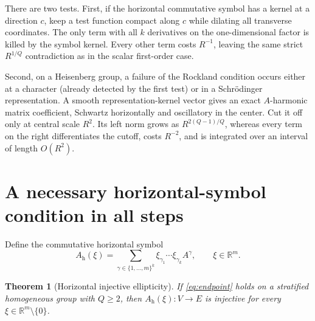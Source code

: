 \documentclass[11pt]{article}
\newtheorem{theorem}{Theorem}
\newcommand{\R}{\mathbb R}
\begin{document}
There are two tests.  First, if the horizontal commutative symbol has a kernel
at a direction $c$, keep a test function compact along $c$ while dilating all
transverse coordinates.  The only term with all $k$ derivatives on the
one-dimensional factor is killed by the symbol kernel.  Every other term
costs $R^{-1}$, leaving the same strict $R^{1/Q}$ contradiction as in the
scalar first-order case.

Second, on a Heisenberg group, a failure of the Rockland condition occurs
either at a character (already detected by the first test) or in a
Schr\"odinger representation.  A smooth representation-kernel vector gives an
exact $A$-harmonic matrix coefficient, Schwartz horizontally and oscillatory
in the center.  Cut it off only at central scale $R^2$.  Its left norm grows
as $R^{2(Q-1)/Q}$, whereas every term on the right differentiates the cutoff,
costs $R^{-2}$, and is integrated over an interval of length $O(R^2)$.

\section{A necessary horizontal-symbol condition in all steps}

Define the commutative horizontal symbol
\begin{equation}\label{eq:symbol}
 A_{\mathrm h}(\xi)
 =\sum_{\gamma\in\{1,\ldots,m\}^k}
   \xi_{\gamma_1}\cdots\xi_{\gamma_k}A^\gamma,
 \qquad \xi\in\R^m.
\end{equation}

\begin{theorem}[Horizontal injective ellipticity]\label{thm:symbol}
If \eqref{eq:endpoint} holds on a stratified homogeneous group with $Q\ge2$,
then $A_{\mathrm h}(\xi):V\to E$ is injective for every
$\xi\in\R^m\setminus\{0\}$.
\end{theorem}
\end{document}
